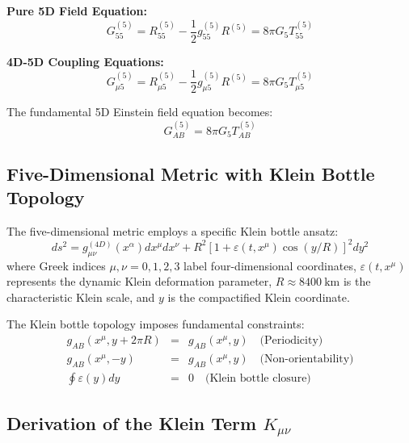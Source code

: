 \documentclass[12pt]{iopart}
\begin{document}
\textbf{Pure 5D Field Equation:}
\begin{equation}
G_{55}^{(5)} = R_{55}^{(5)} - \frac{1}{2}g_{55}^{(5)}R^{(5)} = 8\pi G_5 T_{55}^{(5)}
\label{eq:pure_5d_einstein}
\end{equation}

\textbf{4D-5D Coupling Equations:}
\begin{equation}
G_{\mu 5}^{(5)} = R_{\mu 5}^{(5)} - \frac{1}{2}g_{\mu 5}^{(5)}R^{(5)} = 8\pi G_5 T_{\mu 5}^{(5)}
\label{eq:coupling_einstein}
\end{equation}

The fundamental 5D Einstein field equation becomes:
\begin{equation}
G_{AB}^{(5)} = 8\pi G_5 T_{AB}^{(5)}
\label{eq:5d_einstein_complete}
\end{equation}

\subsection{Five-Dimensional Metric with Klein Bottle Topology}

The five-dimensional metric employs a specific Klein bottle ansatz:
\begin{equation}
ds^2 = g_{\mu\nu}^{(4D)}(x^\alpha) dx^\mu dx^\nu + R^2[1 + \varepsilon(t,x^\mu)\cos(y/R)]^2 dy^2
\label{eq:5d_metric_complete}
\end{equation}
where Greek indices $\mu,\nu = 0,1,2,3$ label four-dimensional coordinates, $\varepsilon(t,x^\mu)$ represents the dynamic Klein deformation parameter, $R \approx \SI{8400}{\kilo\meter}$ is the characteristic Klein scale, and $y$ is the compactified Klein coordinate.

The Klein bottle topology imposes fundamental constraints:
\begin{eqnarray}
g_{AB}(x^\mu, y + 2\pi R) &=& g_{AB}(x^\mu, y) \quad \text{(Periodicity)} \\
g_{AB}(x^\mu, -y) &=& g_{AB}(x^\mu, y) \quad \text{(Non-orientability)} \\
\oint \varepsilon(y) dy &=& 0 \quad \text{(Klein bottle closure)}
\end{eqnarray}

\subsection{Derivation of the Klein Term $K_{\mu\nu}$}
\end{document}
